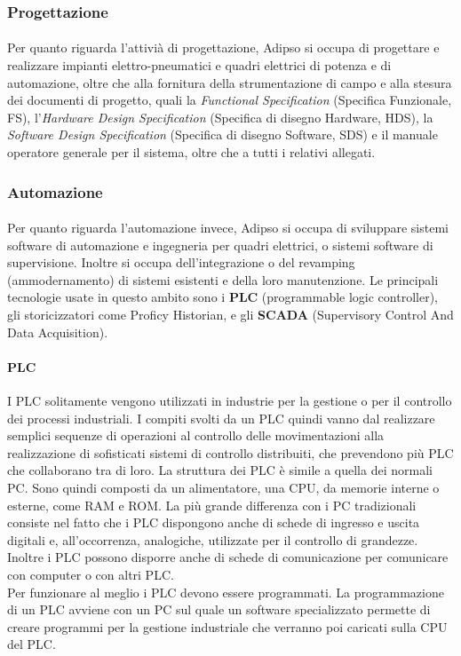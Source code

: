   \subsubsection{Progettazione}
  \paragraph{}
  Per quanto riguarda l'attivià di progettazione, Adipso si occupa di progettare e realizzare impianti 
  elettro-pneumatici e quadri elettrici di potenza e di automazione, oltre che alla fornitura della
  strumentazione di campo e alla stesura dei documenti di progetto, quali la \textit{Functional Specification} (Specifica 
  Funzionale, FS), l'\textit{Hardware Design Specification} (Specifica di disegno Hardware, HDS), la \textit{Software Design 
  Specification} (Specifica di disegno Software, SDS) e il manuale operatore generale per il sistema, oltre che 
  a tutti i relativi allegati.  
  \subsubsection{Automazione}
  \paragraph{}
  Per quanto riguarda l'automazione invece, Adipso si occupa di sviluppare sistemi software di automazione e ingegneria 
  per quadri elettrici, o sistemi software di supervisione. Inoltre si occupa dell'integrazione o del 
  revamping (ammodernamento) di sistemi esistenti e della loro manutenzione. Le principali tecnologie usate 
  in questo ambito sono i \textbf{PLC} (programmable logic controller), gli storicizzatori come Proficy Historian, e 
  gli \textbf{SCADA} (Supervisory Control And Data Acquisition).
  \paragraph{PLC}
  I PLC solitamente vengono utilizzati in industrie per la gestione o per il controllo dei processi industriali.
  I compiti svolti da un PLC quindi vanno dal realizzare semplici sequenze di operazioni al controllo delle 
  movimentazioni alla realizzazione di sofisticati sistemi di controllo distribuiti, che prevendono più PLC 
  che collaborano tra di loro.
  La struttura dei PLC è simile a quella dei normali PC. Sono quindi composti da un alimentatore, una CPU, da 
  memorie interne o esterne, come RAM e ROM. La più grande differenza con i PC tradizionali consiste nel fatto che i PLC 
  dispongono anche di schede di ingresso e uscita digitali e, all'occorrenza, analogiche, utilizzate per il controllo 
  di grandezze. Inoltre i PLC possono disporre anche di schede di comunicazione per comunicare con computer o con altri PLC.\\
  Per funzionare al meglio i PLC devono essere programmati. La programmazione di un PLC avviene con un PC sul quale 
  un software specializzato permette di creare programmi per la gestione industriale che verranno poi caricati sulla CPU del PLC. 

